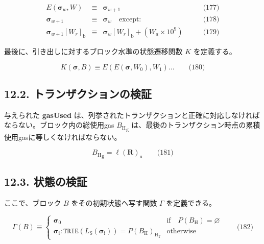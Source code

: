\documentclass[
]{ltjsarticle}
\begin{document}
\[\begin{aligned}
E(\boldsymbol{\sigma}_w, W) & \equiv & \boldsymbol{\sigma}_{w+1} & \qquad \text{(177)} \\
\boldsymbol{\sigma}_{w+1} & \equiv & \boldsymbol{\sigma}_w \quad \text{except:} & \qquad \text{(178)} \\
\boldsymbol{\sigma}_{w+1}[W_r]_{\mathrm{b}} & \equiv & \boldsymbol{\sigma}_{w}[W_r]_{\mathrm{b}} + (W_a \times 10^9) & \qquad \text{(179)}
\end{aligned}\]

\hypertarget{Kappa}{}

最後に、引き出しに対するブロック水準の状態遷移関数 \(K\) を定義する。

\protect\hypertarget{eq-180}{}{}

\[K(\boldsymbol{\sigma}, B) \equiv E(E(\boldsymbol{\sigma}, W_0), W_1) ... \qquad \text{(180)}\]

\hypertarget{ux30c8ux30e9ux30f3ux30b6ux30afux30b7ux30e7ux30f3ux306eux691cux8a3c}{%
\subsection{12.2.
トランザクションの検証}\label{ux30c8ux30e9ux30f3ux30b6ux30afux30b7ux30e7ux30f3ux306eux691cux8a3c}}

与えられた \textbf{gasUsed}
は、列挙されたトランザクションと正確に対応しなければならない。ブロック内の総使用gas
\protect\hyperlink{H__g}{\({B_{\mathrm{H}}}_{\mathrm{g}}\)}
は、最後のトランザクション時点の累積使用gasに等しくなければならない。

\protect\hypertarget{eq-181}{}{}

\[{B_{\mathrm{H}}}_{\mathrm{g}} = \ell(\mathbf{R})_{\mathrm{u}} \qquad \text{(181)}\]

\protect\hypertarget{sec:statenoncevalidation}{}{}

\hypertarget{ux72b6ux614bux306eux691cux8a3c}{%
\subsection{12.3. 状態の検証}\label{ux72b6ux614bux306eux691cux8a3c}}

\hypertarget{Gamma}{}

ここで、ブロック \(B\) をその初期状態へ写す関数 \(\Gamma\)
を定義できる。

\protect\hypertarget{eq-182}{}{}

\[\Gamma(B) \equiv \begin{cases}
\boldsymbol{\sigma}_0 & \text{if} \quad P(B_{\mathrm{H}}) = \varnothing \\
\boldsymbol{\sigma}_{\mathrm{i}}: \mathtt{TRIE}(L_{\mathrm{S}}(\boldsymbol{\sigma}_{\mathrm{i}})) = {P(B_{\mathrm{H}})_{\mathrm{H}}}_{\mathrm{r}} & \text{otherwise}
\end{cases} \qquad \text{(182)}\]
\end{document}
